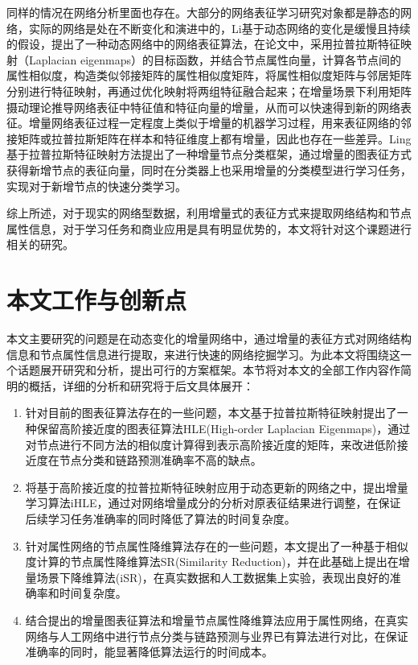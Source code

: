 同样的情况在网络分析里面也存在。大部分的网络表征学习研究对象都是静态的网络，实际的网络是处在不断变化和演进中的，Li\cite{li2017attributed}基于动态网络的变化是缓慢且持续的假设，提出了一种动态网络中的网络表征算法，在论文中，采用拉普拉斯特征映射（Laplacian eigenmaps）的目标函数，并结合节点属性向量，计算各节点间的属性相似度，构造类似邻接矩阵的属性相似度矩阵，将属性相似度矩阵与邻居矩阵分别进行特征映射，再通过优化映射将两组特征融合起来；在增量场景下利用矩阵摄动理论推导网络表征中特征值和特征向量的增量，从而可以快速得到新的网络表征。增量网络表征过程一定程度上类似于增量的机器学习过程，用来表征网络的邻接矩阵或拉普拉斯矩阵在样本和特征维度上都有增量，因此也存在一些差异。Ling\cite{jian2018toward}基于拉普拉斯特征映射方法提出了一种增量节点分类框架，通过增量的图表征方式获得新增节点的表征向量，同时在分类器上也采用增量的分类模型进行学习任务，实现对于新增节点的快速分类学习。

综上所述，对于现实的网络型数据，利用增量式的表征方式来提取网络结构和节点属性信息，对于学习任务和商业应用是具有明显优势的，本文将针对这个课题进行相关的研究。




\section{本文工作与创新点}
本文主要研究的问题是在动态变化的增量网络中，通过增量的表征方式对网络结构信息和节点属性信息进行提取，来进行快速的网络挖掘学习。为此本文将围绕这一个话题展开研究和分析，提出可行的方案框架。本节将对本文的全部工作内容作简明的概括，详细的分析和研究将于后文具体展开：


\begin{enumerate}
	\item 针对目前的图表征算法存在的一些问题，本文基于拉普拉斯特征映射提出了一种保留高阶接近度的图表征算法HLE(High-order Laplacian Eigenmaps)，通过对节点进行不同方法的相似度计算得到表示高阶接近度的矩阵，来改进低阶接近度在节点分类和链路预测准确率不高的缺点。
	\item 将基于高阶接近度的拉普拉斯特征映射应用于动态更新的网络之中，提出增量学习算法iHLE，通过对网络增量成分的分析对原表征结果进行调整，在保证后续学习任务准确率的同时降低了算法的时间复杂度。
	\item 针对属性网络的节点属性降维算法存在的一些问题，本文提出了一种基于相似度计算的节点属性降维算法SR(Similarity Reduction)，并在此基础上提出在增量场景下降维算法(iSR)，在真实数据和人工数据集上实验，表现出良好的准确率和时间复杂度。
	\item 结合提出的增量图表征算法和增量节点属性降维算法应用于属性网络，在真实网络与人工网络中进行节点分类与链路预测与业界已有算法进行对比，在保证准确率的同时，能显著降低算法运行的时间成本。
\end{enumerate}






